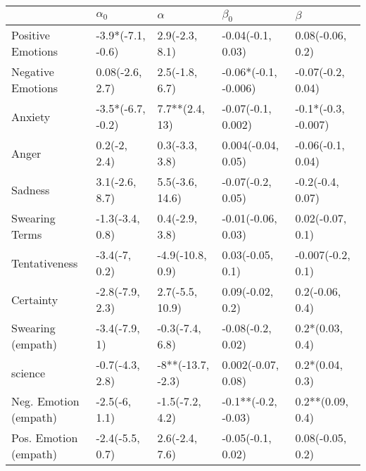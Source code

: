\begin{tabular}{lllll}
\toprule
{} &         $\alpha_0$ &           $\alpha$ &             $\beta_0$ &              $\beta$ \\
\midrule
Positive Emotions     &  -3.9*(-7.1, -0.6) &     2.9(-2.3, 8.1) &     -0.04(-0.1, 0.03) &     0.08(-0.06, 0.2) \\
Negative Emotions     &    0.08(-2.6, 2.7) &     2.5(-1.8, 6.7) &  -0.06*(-0.1, -0.006) &    -0.07(-0.2, 0.04) \\
Anxiety               &  -3.5*(-6.7, -0.2) &     7.7**(2.4, 13) &    -0.07(-0.1, 0.002) &  -0.1*(-0.3, -0.007) \\
Anger                 &       0.2(-2, 2.4) &     0.3(-3.3, 3.8) &    0.004(-0.04, 0.05) &    -0.06(-0.1, 0.04) \\
Sadness               &     3.1(-2.6, 8.7) &    5.5(-3.6, 14.6) &     -0.07(-0.2, 0.05) &     -0.2(-0.4, 0.07) \\
Swearing Terms        &    -1.3(-3.4, 0.8) &     0.4(-2.9, 3.8) &    -0.01(-0.06, 0.03) &     0.02(-0.07, 0.1) \\
Tentativeness         &      -3.4(-7, 0.2) &   -4.9(-10.8, 0.9) &      0.03(-0.05, 0.1) &    -0.007(-0.2, 0.1) \\
Certainty             &    -2.8(-7.9, 2.3) &    2.7(-5.5, 10.9) &      0.09(-0.02, 0.2) &      0.2(-0.06, 0.4) \\
Swearing (empath)     &      -3.4(-7.9, 1) &    -0.3(-7.4, 6.8) &     -0.08(-0.2, 0.02) &      0.2*(0.03, 0.4) \\
science               &    -0.7(-4.3, 2.8) &  -8**(-13.7, -2.3) &    0.002(-0.07, 0.08) &      0.2*(0.04, 0.3) \\
Neg. Emotion (empath) &      -2.5(-6, 1.1) &    -1.5(-7.2, 4.2) &   -0.1**(-0.2, -0.03) &     0.2**(0.09, 0.4) \\
Pos. Emotion (empath) &    -2.4(-5.5, 0.7) &     2.6(-2.4, 7.6) &     -0.05(-0.1, 0.02) &     0.08(-0.05, 0.2) \\
\bottomrule
\end{tabular}
